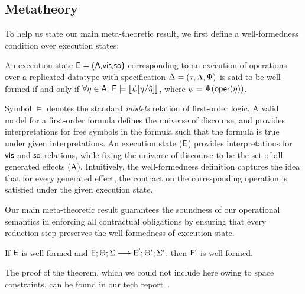 \subsection{Metatheory}

To help us state our main meta-theoretic result, we first define a
well-formedness condition over execution states:

\begin{definition}
An execution state ${\normalfont \textsf{E}} = {\normalfont \textsf{({\normalfont \textsf{A}},\allowbreak {\normalfont \textsf{vis}},\allowbreak {\normalfont \textsf{so}})}}$ corresponding to an execution of
operations over a replicated datatype with specification $\Delta =
(\tau,\Lambda,\Psi)$ is said to be well-formed if and only if 
$\forall \eta \in {\normalfont \textsf{A}}. ~{\normalfont \textsf{E}} \models [\![\psi[\eta/\hat{\eta}]]\!]$, where $\psi =
\Psi({\normalfont \textsf{oper}}(\eta))$.
\end{definition}

Symbol $\models$ denotes the standard \emph{models} relation of
first-order logic.  A valid model for a first-order formula defines
the universe of discourse, and provides interpretations for free
symbols in the formula such that the formula is true under given
interpretations.  An execution state (${\normalfont \textsf{E}}$) provides interpretations
for ${\normalfont \textsf{vis}}$ and ${\normalfont \textsf{so}}$ relations, while fixing the universe of
discourse to be the set of all generated effects (${\normalfont \textsf{A}}$).
Intuitively, the well-formedness definition captures the idea that for
every generated effect, the contract on the corresponding operation is
satisfied under the given execution state. 

Our main meta-theoretic result guarantees the soundness of our
operational semantics in enforcing all contractual obligations by
ensuring that every reduction step preserves the well-formedness of
execution state.

\begin{theorem}
\label{lem:core-preservation}
If ${\normalfont \textsf{E}}$ is well-formed and ${\normalfont \textsf{E}}; \Theta; \Sigma \longrightarrow {\normalfont \textsf{E}}'; \Theta';
\Sigma'$, then ${\normalfont \textsf{E}}'$ is well-formed.
\end{theorem}
%

The proof of the theorem, which we could not include here owing to
space constraints, can be found in our tech report~\cite{techrep}.

